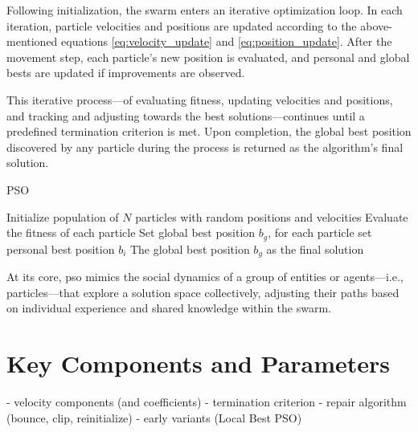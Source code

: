 {Following initialization, the swarm enters an iterative optimization loop. In each iteration, particle velocities and positions are updated according to the above-mentioned equations \eqref{eq:velocity_update} and \eqref{eq:position_update}. After the movement step, each particle's new position is evaluated, and personal and global bests are updated if improvements are observed.


This iterative process---of evaluating fitness, updating velocities and positions, and tracking and adjusting towards the best solutions---continues until a predefined termination criterion is met.
Upon completion, the global best position discovered by any particle during the process is returned as the algorithm's final solution.

\vspace{.935em}

\begin{algorithm}[H]
\caption{PSO}
Initialize population of \(N\) particles with random positions and velocities\;
Evaluate the fitness of each particle\;
Set global best position \(b_g\), for each particle set personal best position \(b_i\)\;
\Return The global best position \(b_g\) as the final solution\;
\end{algorithm}

\vspace{.935em}

At its core, \acrshort{pso} mimics the social dynamics of a group of entities or agents---i.e., particles---that explore a solution space collectively, adjusting their paths based on individual experience and shared knowledge within the swarm. 

\section{Key Components and Parameters}

- velocity components (and coefficients)
- termination criterion
- repair algorithm (bounce, clip, reinitialize)
- early variants (Local Best PSO)


}
